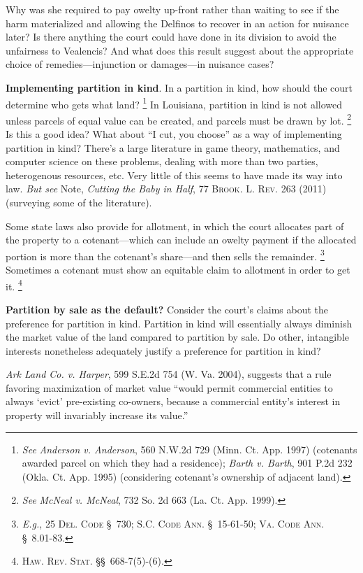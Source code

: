 Why was she required to pay owelty up-front rather than waiting to see if the
harm materialized and allowing the Delfinos to recover in an action for
nuisance later? Is there anything the court could have done in its division to
avoid the unfairness to Vealencis? And what does this result suggest about the
appropriate choice of remedies---injunction or damages---in nuisance cases?



\item \textbf{Implementing partition in kind}. In a partition in kind, how
should the court determine who gets what land? \footnote{\textit{See}
\emph{Anderson v. Anderson}, 560 N.W.2d 729 (Minn. Ct. App. 1997) (cotenants
awarded parcel on which they had a residence); \emph{Barth v. Barth}, 901 P.2d
232 (Okla. Ct. App. 1995) (considering cotenant's ownership of adjacent land).}
In Louisiana, partition in kind is not allowed unless parcels of equal value can
be created, and parcels must be drawn by lot. \footnote{\emph{See} \emph{McNeal
v. McNeal}, 732 So. 2d 663 (La. Ct. App. 1999).} Is this a good idea? What about
``I cut, you choose'' as a way of implementing partition in kind? There's a
large literature in game theory, mathematics, and computer science on these
problems, dealing with more than two parties, heterogenous resources, etc. Very
little of this seems to have made its way into law. \textit{But see} Note,
\textit{Cutting the Baby in Half}, 77 \textsc{Brook. L. Rev.} 263 (2011)
(surveying some of the literature).


Some state laws also provide for allotment, in which the court allocates part of
the property to a cotenant---which can include an owelty payment if the
allocated portion is more than the cotenant's share---and then sells the
remainder. \footnote{\emph{E.g.}, 25 \textsc{Del. Code} \S~730; \textsc{S.C.
Code Ann.} \S~15-61-50; \textsc{Va. Code Ann.} \S~8.01-83.} Sometimes a cotenant
must show an equitable claim to allotment in order to get it.
\footnote{\textsc{Haw. Rev. Stat.} \S\S~668-7(5)-(6).}



\item \textbf{Partition by sale as the default?} Consider the court's
claims about the preference for partition in kind. Partition in kind will
essentially always diminish the market value of the land compared to partition
by sale. Do other, intangible interests nonetheless adequately justify a
preference for partition in kind?


\textit{Ark Land Co. v. Harper}, 599 S.E.2d 754 (W. Va. 2004), suggests that a
rule favoring maximization of market value ``would permit commercial entities
to always `evict' pre-existing co-owners, because a commercial entity's
interest in property will invariably increase its value.''

